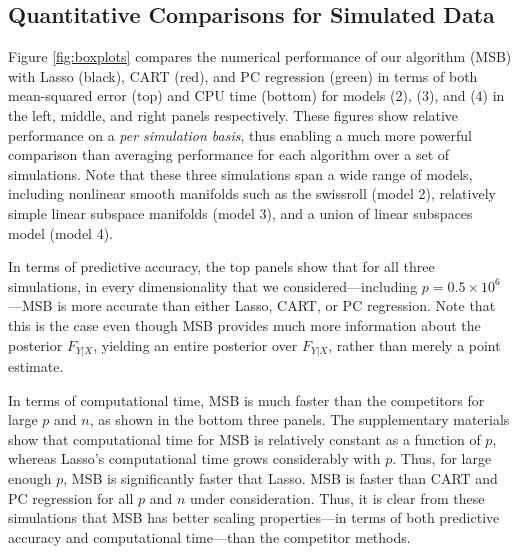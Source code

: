 \documentclass{article} %
\begin{document}
\subsection{Quantitative Comparisons for Simulated Data} \label{sub:sim}

Figure \ref{fig:boxplots} compares the numerical performance of our algorithm (MSB) with Lasso (black), CART (red), and PC regression (green) in terms of both mean-squared error (top) and CPU time (bottom) for models (2), (3), and (4) in the left, middle, and right panels respectively. These figures show relative performance on a \emph{per simulation basis}, thus enabling a much more powerful comparison than averaging performance for each algorithm over a set of simulations.  Note that these three simulations span a wide range of models, including
nonlinear smooth manifolds such as the swissroll (model 2),
relatively simple linear subspace manifolds (model 3), 
and a union of linear subspaces model (model 4).

In terms of predictive accuracy, the top panels show that for all three simulations,  in every dimensionality that we considered---including $p = 0.5 \times 10^6$---MSB is more accurate than either Lasso, CART, or PC regression.  Note that this is the case even though MSB provides much more information about the posterior $F_{Y|X}$, yielding an entire posterior over $F_{Y|X}$, rather than merely a point estimate.

In terms of computational time, MSB is much faster than the competitors for large $p$ and $n$, as shown in the bottom three panels.  The supplementary materials show that computational time for MSB is relatively constant as a function of $p$, whereas Lasso's computational time grows considerably with $p$.  Thus, for large enough $p$, MSB is significantly faster that Lasso.  MSB is faster than CART and PC regression for all $p$ and $n$ under consideration.  Thus, it is clear from these simulations that MSB has better scaling properties---in terms of both predictive accuracy and computational time---than the competitor methods. 
\end{document}
